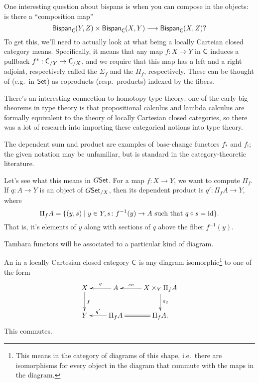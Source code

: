 One interesting question about bispans is when you can compose in the objects: is there a ``composition map''
\begin{equation}
\label{compbispan}
\mathsf{Bispan}_\mathsf C(Y,Z)\times\mathsf{Bispan}_\mathsf C(X,Y)\longrightarrow\mathsf{Bispan}_\mathsf C(X,Z)?
\end{equation}
To get this, we'll need to actually look at what being a locally Carteian closed category means. Specifically, it
means that any map $f\colon X\to Y$ in $\mathsf C$ induces a pullback $f^*:\mathsf C_{/Y}\to\mathsf C_{/X}$, and we require that this
map has a left and a right adjoint, respectively called the  $\Sigma_f$ and the  $\Pi_f$, respectively. These can be thought of (e.g.\ in $\mathsf{Set}$) as coproducts (resp.\ products) indexed
by the fibers.
\begin{rem}
There's an interesting connection to homotopy type theory: one of the early big theorems in type theory is that
propositional calculus and lambda calculus are formally equivalent to the theory of locally Cartesian closed
categories, so there was a lot of research into importing these categorical notions into type theory.

The dependent sum and product are examples of base-change functors $f_*$ and $f_!$; the given notation may be
unfamiliar, but is standard in the category-theoretic literature.
\end{rem}
\begin{exm}
Let's see what this means in $G\mathsf{Set}$. For a map $f\colon X\to Y$, we want to compute $\Pi_f$. If $q\colon A\to Y$
is an object of $G\mathsf{Set}_{/X}$, then its dependent product is $q'\colon \Pi_fA\to Y$, where
\[\Pi_f A = \{(y,s)\mid y\in Y, s\colon f^{-1}(y)\to A\text{ such that } q\circ s = \mathrm{id}\}.\]
That is, it's elements of $y$ along with sections of $q$ above the fiber $f^{-1}(y)$.
\end{exm}
Tambara functors will be associated to a particular kind of diagram.
\begin{defn}
An  in a locally Cartesian closed category $\mathsf C$ is any diagram isomorphic\footnote{This
means in the category of diagrams of this shape, i.e.\ there are isomorphisms for every object in the diagram that
commute with the maps in the diagram.} to one of the form
\begin{equation}
\label{exponential}
\gathxy{
	X\ar[d]^f & A\ar[l]_-q & X\times_Y \Pi_f A\ar[l]_-{\mathit{ev}}\ar[d]^{\pi_2}\\
	Y & \Pi_f A\ar[l]_-{q'} & \Pi_fA.\ar@{=}[l]
}
\end{equation}
This commutes.
\end{defn}
